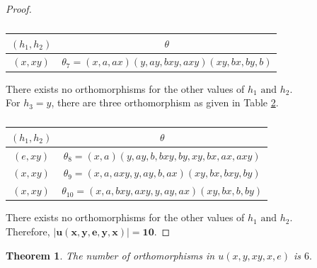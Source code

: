 \documentclass[11pt,a4paper]{article}
\newtheorem{theorem}{Theorem}[section]
\theoremstyle{definition}
\theoremstyle{remark}
\begin{document}
\begin{proof}
	\begin{table}[H]
	\begin{center}
			\begin{tabular}{|c|c|}
			\hline
			$(h_{1},h_{2})$ & $\theta$\\ \hline
			$(x,xy)$ &  $\theta_{7} = (x,a,ax)(y,ay,bxy,axy)(xy,bx,by,b)$ \\ \hline
		\end{tabular} \caption{} \label{t13}
	\end{center}
	\end{table}
	\vspace{-.7cm}
		There exists no orthomorphisms for the other values of $h_{1} \text{ and } h_{2}$.\\
	For $h_{3} = y$, there are three orthomorphism as given in Table \ref{t14}.
	\begin{table}[H]
		\begin{center}
			\begin{tabular}{|c|c|}
			\hline
			$(h_{1},h_{2})$ & $\theta$\\ \hline
			$(e,xy)$ &  $\theta_{8} = (x,a)(y,ay,b,bxy,by,xy,bx,ax,axy)$ \\ \hline
			$(x,xy)$ & $\theta_{9} = (x,a,axy,y,ay,b,ax)(xy,bx,bxy,by)$\\ \hline
			$(x,xy)$ & $\theta_{10} = (x,a,bxy,axy,y,ay,ax)(xy,bx,b,by)$ \\ \hline
		\end{tabular}\caption{} \label{t14}
		\end{center}
	\end{table}
	\vspace{-.7cm}
			There exists no orthomorphisms for the other values of $h_{1} \text{ and } h_{2}$.\\
	Therefore, $\bm{\vert u(x,y,e,y,x) \vert = 10}.$
\end{proof}
\begin{theorem}\label{th6}
 	The number of orthomorphisms in  $u(x,y,xy,x,e)$ is $6.$
\end{theorem}
\end{document}
